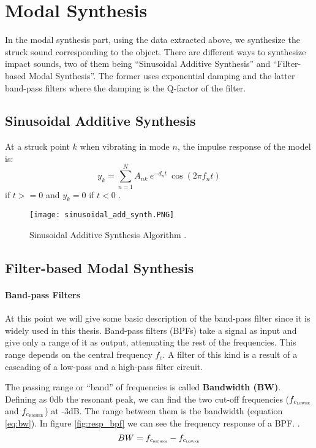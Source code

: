\section{Modal Synthesis}\label{sec:modal_synth}
In the modal synthesis part, using the data extracted above, we synthesize the struck sound corresponding to the object. There are different ways to synthesize impact sounds, two of them being ``Sinusoidal Additive Synthesis'' and ``Filter-based Modal Synthesis''. The former uses exponential damping and the latter band-pass filters where the damping is the Q-factor of the filter. 

\subsection{Sinusoidal Additive Synthesis}\label{sec:sin_synth}
At a struck point $k$ when vibrating in mode $n$, the impulse response of the model is:
\begin{equation}\label{eq:modal_response}
y_k = \sum\limits_{n=1}^{N} A_{nk}\ e^{-d_n t}\ \cos(2 \pi f_nt)
\end{equation}
if $t>=0$ and $y_k = 0$ if $t<0$ \cite{van2001foleyautomatic}.

\begin{figure}[H]
  \centering
    \texttt{[image: sinusoidal\_add\_synth.PNG]}
      \caption{Sinusoidal Additive Synthesis Algorithm \cite{Cook:2002:RSS:515316}.}
      \label{fig:sin_add_synth}
\end{figure}

\subsection{Filter-based Modal Synthesis}\label{sec:add_synth}

\paragraph{Band-pass Filters\\}\label{par:bpf}

At this point we will give some basic description of the band-pass filter since it is widely used in this thesis. Band-pass filters (BPFs) take a signal as input and give only a range of it as output, attenuating the rest of the frequencies. This range depends on the central frequency $f_c$. A filter of this kind is a result of a cascading of a low-pass and a high-pass filter circuit.

The passing range or ``band'' of frequencies is called \textbf{Bandwidth (BW)}. Defining as 0db the resonant peak, we can find the two cut-off frequencies ($f_{c{_\textsc{lower}}}$ and $f_{c_{\textsc{higher}}}$) at -3dB. The range between them is the bandwidth (equation \ref{eq:bw}). In figure \ref{fig:resp_bpf} we can see the frequency response of a BPF. \cite{bib:bpf}. 
\begin{equation}\label{eq:bw}
BW = f_{c_{\textsc{higher}}}-f_{c_{\textsc{lower}}}
\end{equation}   

